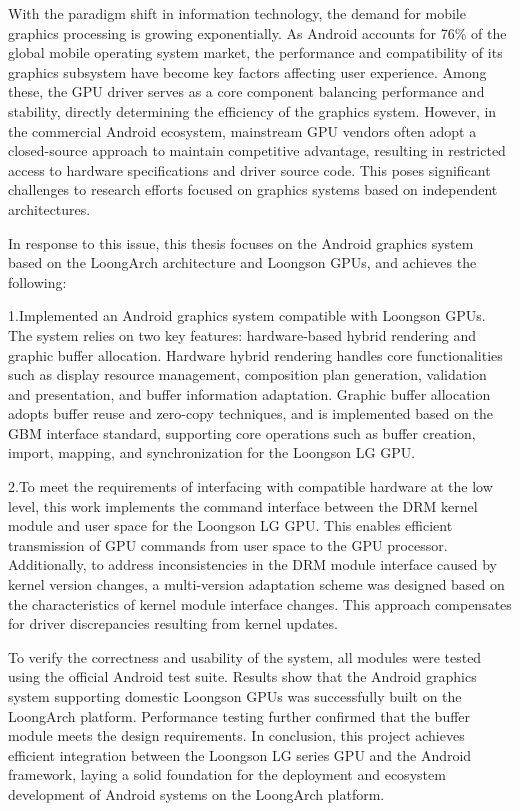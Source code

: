 \begin{abstract*}

With the paradigm shift in information technology, the demand for mobile graphics processing is growing exponentially. 
As Android accounts for 76\% of the global mobile operating system market, the performance and compatibility of its 
graphics subsystem have become key factors affecting user experience. 
Among these, the GPU driver serves as a core component balancing performance and stability, 
directly determining the efficiency of the graphics system. However, in the commercial Android ecosystem, 
mainstream GPU vendors often adopt a closed-source approach to maintain competitive advantage, 
resulting in restricted access to hardware specifications and driver source code. 
This poses significant challenges to research efforts focused on graphics systems based on independent architectures.

In response to this issue, this thesis focuses on the Android graphics system based on the LoongArch architecture and Loongson GPUs, 
and achieves the following:

1.Implemented an Android graphics system compatible with Loongson GPUs. 
The system relies on two key features: hardware-based hybrid rendering and graphic buffer allocation.
Hardware hybrid rendering handles core functionalities such as display resource management, composition plan generation, 
validation and presentation, and buffer information adaptation.
Graphic buffer allocation adopts buffer reuse and zero-copy techniques, and is implemented based on the GBM interface standard, 
supporting core operations such as buffer creation, import, mapping, and synchronization for the Loongson LG GPU.

2.To meet the requirements of interfacing with compatible hardware at the low level, 
this work implements the command interface between the DRM kernel module and user space for the Loongson LG GPU. 
This enables efficient transmission of GPU commands from user space to the GPU processor.
Additionally, to address inconsistencies in the DRM module interface caused by kernel version changes, 
a multi-version adaptation scheme was designed based on the characteristics of kernel module interface changes. 
This approach compensates for driver discrepancies resulting from kernel updates.

To verify the correctness and usability of the system, all modules were tested using the official Android test suite. 
Results show that the Android graphics system supporting domestic Loongson GPUs was successfully built on the LoongArch platform. 
Performance testing further confirmed that the buffer module meets the design requirements.
In conclusion, this project achieves efficient integration between the Loongson LG series GPU and the Android framework, 
laying a solid foundation for the deployment and ecosystem development of Android systems on the LoongArch platform.


\end{abstract*}
